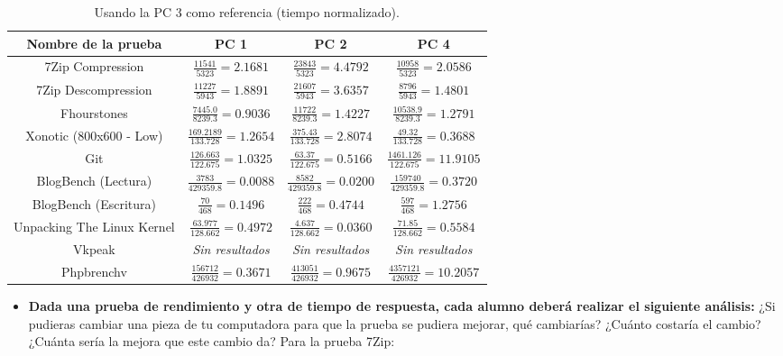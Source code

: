\documentclass[12pt]{article}
\begin{document}
\begin{enumerate}[label=(\arabic{section}.\arabic{subsection}.\arabic{enumi})]
    \begin{table}[htb]
       \centering
        \begin{tabular}{|c|c|c|c|}
        \hline
        \textbf{Nombre de la prueba} & \textbf{PC 1} & \textbf{PC 2} & \textbf{PC 4}\\
        \hline
        7Zip Compression & $\frac{11541}{5323}=2.1681$ & $\frac{23843}{5323}=4.4792$ & $\frac{10958}{5323}=2.0586$ \\
        \hline
        7Zip Descompression& $\frac{11227}{5943}=1.8891$ & $\frac{21607}{5943}=3.6357$ & $\frac{8796}{5943}=1.4801$ \\
        \hline
        Fhourstones & $\frac{7445.0}{8239.3}=0.9036$ & $\frac{11722}{8239.3}=1.4227$ & $\frac{10538.9}{8239.3}=1.2791$ \\
        \hline
        Xonotic (800x600 - Low) & $\frac{169.2189}{133.728}=1.2654$ & $\frac{375.43}{133.728}=2.8074$ & $\frac{49.32}{133.728}=0.3688$ \\
        \hline
        Git & $\frac{126.663}{122.675}=1.0325$ & $\frac{63.37}{122.675}=0.5166$ & $\frac{1461.126}{122.675}=11.9105$ \\
        \hline
        BlogBench (Lectura) & $\frac{3783}{429359.8}=0.0088$ & $\frac{8582}{429359.8}=0.0200$ & $\frac{159740}{429359.8}=0.3720$ \\
        \hline
        BlogBench (Escritura) & $\frac{70}{468}=0.1496$ & $\frac{222}{468}=0.4744$ & $\frac{597}{468}=1.2756$ \\
        \hline
        Unpacking The Linux Kernel & $\frac{63.977}{128.662}=0.4972$ & $\frac{4.637}{128.662}=0.0360$ & $\frac{71.85}{128.662}=0.5584$ \\
        \hline
        Vkpeak & \textit{Sin resultados} & \textit{Sin resultados} & \textit{Sin resultados} \\
        \hline
        Phpbrenchv & $\frac{156712}{426932}=0.3671$ & $\frac{413051}{426932}=0.9675$ & $\frac{4357121}{426932}=10.2057$ \\
        \hline
        \end{tabular}
        \caption{Usando la PC 3 como referencia (tiempo normalizado).}
    \end{table}

    \begin{itemize}
    	\item \textbf{Dada una prueba de rendimiento y otra de tiempo de respuesta, cada alumno deberá realizar el siguiente análisis:} ¿Si pudieras cambiar una pieza de tu computadora para que la prueba se pudiera mejorar, qué cambiarías? ¿Cuánto costaría el cambio? ¿Cuánta sería la mejora que este cambio da? Para la prueba 7Zip:
    	

\end{itemize}
\end{enumerate}
\end{document}
